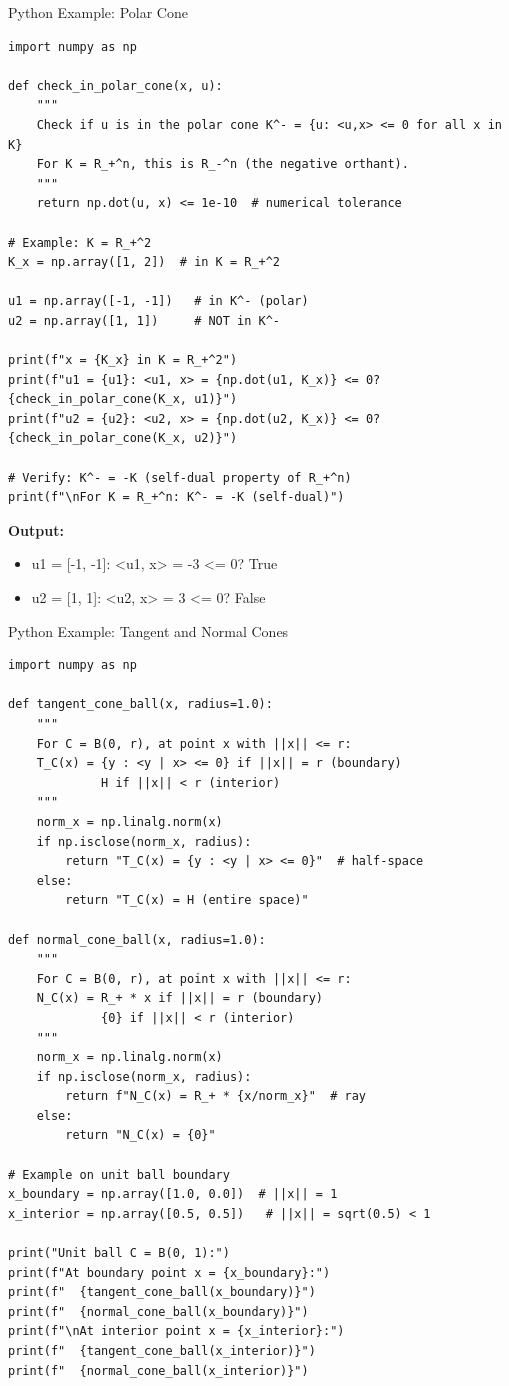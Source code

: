 \documentclass[aspectratio=169,10pt]{beamer}
\begin{document}
\begin{frame}[fragile]{Python Example: Polar Cone}
\begin{lstlisting}
import numpy as np

def check_in_polar_cone(x, u):
    """
    Check if u is in the polar cone K^- = {u: <u,x> <= 0 for all x in K}
    For K = R_+^n, this is R_-^n (the negative orthant).
    """
    return np.dot(u, x) <= 1e-10  # numerical tolerance

# Example: K = R_+^2
K_x = np.array([1, 2])  # in K = R_+^2

u1 = np.array([-1, -1])   # in K^- (polar)
u2 = np.array([1, 1])     # NOT in K^-

print(f"x = {K_x} in K = R_+^2")
print(f"u1 = {u1}: <u1, x> = {np.dot(u1, K_x)} <= 0? {check_in_polar_cone(K_x, u1)}")
print(f"u2 = {u2}: <u2, x> = {np.dot(u2, K_x)} <= 0? {check_in_polar_cone(K_x, u2)}")

# Verify: K^- = -K (self-dual property of R_+^n)
print(f"\nFor K = R_+^n: K^- = -K (self-dual)")
\end{lstlisting}

\vspace{0.3cm}

\textbf{Output:}
\begin{itemize}
    \item u1 = [-1, -1]: <u1, x> = -3 <= 0? True
    \item u2 = [1, 1]: <u2, x> = 3 <= 0? False
\end{itemize}
\end{frame}

\begin{frame}[fragile]{Python Example: Tangent and Normal Cones}
\begin{lstlisting}
import numpy as np

def tangent_cone_ball(x, radius=1.0):
    """
    For C = B(0, r), at point x with ||x|| <= r:
    T_C(x) = {y : <y | x> <= 0} if ||x|| = r (boundary)
             H if ||x|| < r (interior)
    """
    norm_x = np.linalg.norm(x)
    if np.isclose(norm_x, radius):
        return "T_C(x) = {y : <y | x> <= 0}"  # half-space
    else:
        return "T_C(x) = H (entire space)"

def normal_cone_ball(x, radius=1.0):
    """
    For C = B(0, r), at point x with ||x|| <= r:
    N_C(x) = R_+ * x if ||x|| = r (boundary)
             {0} if ||x|| < r (interior)
    """
    norm_x = np.linalg.norm(x)
    if np.isclose(norm_x, radius):
        return f"N_C(x) = R_+ * {x/norm_x}"  # ray
    else:
        return "N_C(x) = {0}"

# Example on unit ball boundary
x_boundary = np.array([1.0, 0.0])  # ||x|| = 1
x_interior = np.array([0.5, 0.5])   # ||x|| = sqrt(0.5) < 1

print("Unit ball C = B(0, 1):")
print(f"At boundary point x = {x_boundary}:")
print(f"  {tangent_cone_ball(x_boundary)}")
print(f"  {normal_cone_ball(x_boundary)}")
print(f"\nAt interior point x = {x_interior}:")
print(f"  {tangent_cone_ball(x_interior)}")
print(f"  {normal_cone_ball(x_interior)}")
\end{lstlisting}
\end{frame}
\end{document}
